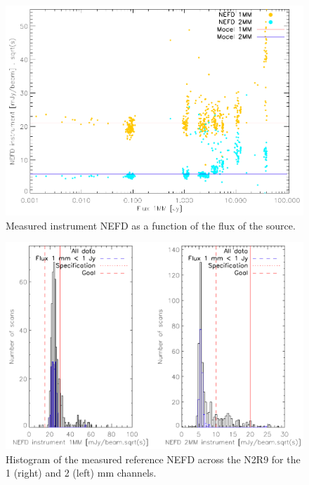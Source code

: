 \documentclass[a4paper, 11pt]{article} %
\begin{document}
\begin{figure}
\begin{center}
\includegraphics[clip, angle=0, scale =0.8]{Figures/NEFDIndScans/nefd_flux1mm_run22.pdf}
\caption{Measured instrument NEFD as a function of the flux of the source.}
\label{fig:nefdvsflux}
\end{center}
\end{figure}
\begin{figure}
\begin{center}
\includegraphics[clip, angle=0, scale =0.8]{Figures/NEFDIndScans/hist_nefd_ref_run22.pdf}
\caption{Histogram of the measured reference NEFD across the N2R9 for the 1 (right) and 2 (left) mm channels.}
\label{fig:nefdhist}
\end{center}
\end{figure}
 
\end{document}
